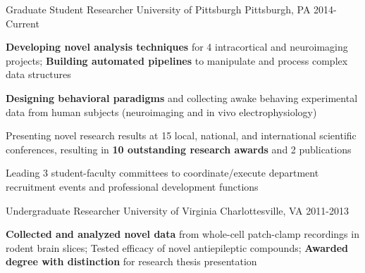 \vspace*{-0.25cm}

\vspace*{0.3cm}

\begin{cventries}

\cventry
    {Graduate Student Researcher} %
    {University of Pittsburgh} %
    {Pittsburgh, PA} %
    {2014-Current} %
    {
      \begin{cvitems} %
        \item {\textbf{Developing novel analysis techniques} for 4 intracortical and neuroimaging projects; \textbf{Building automated pipelines} to manipulate and process complex data structures}
        \item {\textbf{Designing behavioral paradigms} and collecting awake behaving experimental data from human subjects (neuroimaging and in vivo electrophysiology)}
        \item {Presenting novel research results at 15 local, national, and international scientific conferences, resulting in \textbf{10 outstanding research awards} and 2 publications}
        \item {Leading 3 student-faculty committees to coordinate/execute department recruitment events and professional development functions}
      \end{cvitems}
    }
    \vspace*{0.2cm}
    
\cventry
    {Undergraduate Researcher}%
    {University of Virginia}
    {Charlottesville, VA} %
    {2011-2013} %
    {
      \begin{cvitems}
      	\item {\textbf{Collected and analyzed novel data} from whole-cell patch-clamp recordings in rodent brain slices; Tested efficacy of novel antiepileptic compounds; \textbf{Awarded degree with distinction} for research thesis presentation}
      \end{cvitems}
    }
    \vspace*{0.2cm}


\end{cventries}

